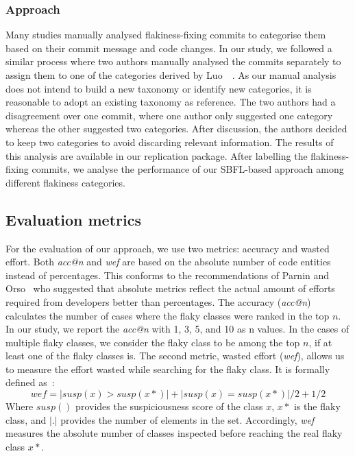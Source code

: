 \subsubsection{Approach}
Many studies manually analysed flakiness-fixing commits to categorise them~\cite{Luo2014,Thorve2018} based on their commit message and code changes.
In our study, we followed a similar process where two authors manually analysed the commits separately to assign them to one of the categories derived by Luo~\etal~\cite{Luo2014}.
As our manual analysis does not intend to build a new taxonomy or identify new categories, it is reasonable to adopt an existing taxonomy as reference.
The two authors had a disagreement over one commit, where one author only suggested one category whereas the other suggested two categories.
After discussion, the authors decided to keep two categories to avoid discarding relevant information.
The results of this analysis are available in our replication package.
After labelling the flakiness-fixing commits, we analyse the performance of our SBFL-based approach among different flakiness categories. 


\subsection{Evaluation metrics}
For the evaluation of our approach, we use two metrics: accuracy and wasted effort. 
Both \textit{acc@n} and \textit{wef} are based on the absolute number of code entities instead of percentages.
This conforms to the recommendations of Parnin and Orso~\cite{parnin} who suggested that absolute metrics reflect the actual amount of efforts required from developers better than percentages. 
The accuracy (\textit{acc@n}) calculates the number of cases where the flaky classes were ranked in the top $n$.
In our study, we report the \textit{acc@n} with 1, 3, 5, and 10 as n values. %
In the cases of multiple flaky classes, we consider the flaky class to be among the top $n$, if at least one of the flaky classes is.
The second metric, wasted effort (\textit{wef}), allows us to measure the effort wasted while searching for the flaky class. It is formally defined as~\cite{monperrus-ICSME}:
\[ wef = |{susp(x) > susp(x*)}| + |{susp(x) = susp(x*)}|/2 + 1/2\]
Where $susp()$ provides the suspiciousness score of the class $x$, $x*$ is the flaky class, and $|.|$ provides the number of elements in the set. Accordingly, \textit{wef} measures the absolute number of classes inspected before reaching the real flaky class $x*$. 

